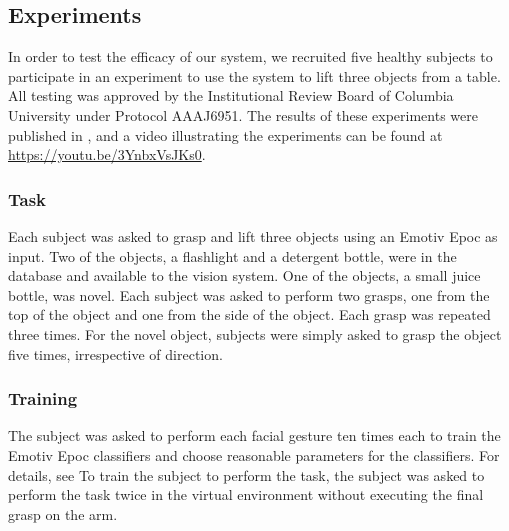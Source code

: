 \subsection{Experiments}
In order to test the efficacy of our system, we recruited five healthy subjects to participate in an experiment to use the system to lift three objects from a table.  All testing was approved by the Institutional Review Board of Columbia University under Protocol AAAJ6951. The results of these experiments were published in \cite{Weisz2013}, and a video illustrating the experiments can be found at \url{https://youtu.be/3YnbxVsJKs0}.

\subsubsection{Task}
Each subject was asked to grasp and lift three objects using an Emotiv Epoc as input. Two of the objects, a flashlight and a detergent bottle, were in the database and available to the vision system. One of the objects, a small juice bottle, was novel. Each subject was asked to perform two grasps, one from the top of the object and one from the side of the object. Each grasp was repeated three times. For the novel object, subjects were simply asked to grasp the object five times, irrespective of direction.


\subsubsection{Training}
\label{sec:emotiv_training}
The subject was asked to perform each facial gesture ten times each to train the Emotiv Epoc classifiers and choose reasonable parameters for the classifiers. For details, see \cite{Weisz2013} To train the subject to perform the task, the subject was asked to perform the task twice in the virtual environment without executing the final grasp on the arm. 

